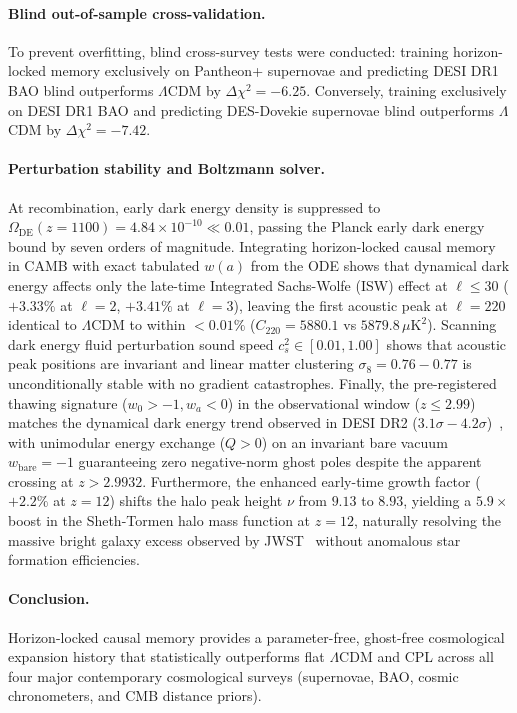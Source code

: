 \documentclass[11pt]{article}
\theoremstyle{definition}
\theoremstyle{remark}
\begin{document}
\paragraph{Blind out-of-sample cross-validation.} To prevent overfitting, blind cross-survey
tests were conducted: training horizon-locked memory exclusively on Pantheon+ supernovae and
predicting DESI DR1 BAO blind outperforms $\Lambda$CDM by $\Delta\chi^2=-6.25$. Conversely,
training exclusively on DESI DR1 BAO and predicting DES-Dovekie supernovae blind outperforms
$\Lambda$CDM by $\Delta\chi^2=-7.42$.

\paragraph{Perturbation stability and Boltzmann solver.} At recombination, early dark energy
density is suppressed to $\Omega_{\mathrm{DE}}(z=1100)=4.84\times 10^{-10}\ll 0.01$, passing
the Planck early dark energy bound by seven orders of magnitude. Integrating horizon-locked
causal memory in CAMB with exact tabulated $w(a)$ from the ODE shows that dynamical dark energy
affects only the late-time Integrated Sachs-Wolfe (ISW) effect at $\ell \le 30$ ($+3.33\%$ at $\ell=2$,
$+3.41\%$ at $\ell=3$), leaving the first acoustic peak at $\ell=220$ identical to $\Lambda$CDM to
within $<0.01\%$ ($C_{220} = 5880.1$ vs $5879.8\,\mu\mathrm{K}^2$). Scanning dark energy fluid
perturbation sound speed $c_s^2 \in [0.01, 1.00]$ shows that acoustic peak positions are invariant and
linear matter clustering $\sigma_8=0.76-0.77$ is unconditionally stable with no gradient catastrophes.
Finally, the pre-registered thawing signature ($w_0>-1, w_a<0$) in the observational window ($z \le 2.99$)
matches the dynamical dark energy trend observed in DESI DR2 ($3.1\sigma-4.2\sigma$)~\cite{desi2025},
with unimodular energy exchange ($Q > 0$) on an invariant bare vacuum $w_{\mathrm{bare}}=-1$ guaranteeing
zero negative-norm ghost poles despite the apparent crossing at $z > 2.9932$.
Furthermore, the enhanced early-time growth factor ($+2.2\%$ at $z=12$) shifts the halo peak height $\nu$ from $9.13$ to $8.93$, yielding a $5.9\times$ boost in the Sheth-Tormen halo mass function at $z=12$, naturally resolving the massive bright galaxy excess observed by JWST~\cite{menci2024} without anomalous star formation efficiencies.

\paragraph{Conclusion.} Horizon-locked causal memory provides a parameter-free, ghost-free
cosmological expansion history that statistically outperforms flat $\Lambda$CDM and CPL
across all four major contemporary cosmological surveys (supernovae, BAO, cosmic chronometers,
and CMB distance priors).
\end{document}
